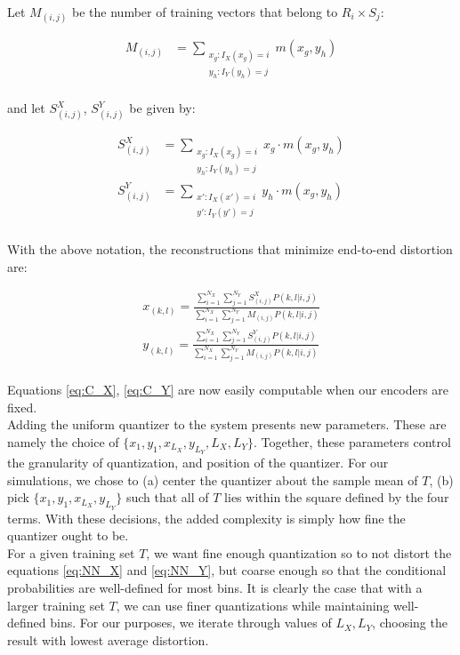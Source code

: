 \documentclass[10pt]{article}
\begin{document}
Let $M_{(i,j)}$ be the number of training vectors that belong to $R_i\times S_j$:

\begin{align}
    M_{(i,j)} &=
    \sum_{\substack{x_g:I_X(x_g)=i\\y_h:I_Y(y_h)=j}}m(x_g,y_h)
\end{align}
\\
and let $S_{(i,j)}^X$, $S_{(i,j)}^Y$ be given by:

\begin{align}
    S^X_{(i,j)} &=
    \sum_{\substack{x_g:I_X(x_g)=i\\y_h:I_Y(y_h)=j}}x_g\cdot m(x_g,y_h)\\
    S^Y_{(i,j)} &=
    \sum_{\substack{x':I_X(x')=i\\y':I_Y(y')=j}}y_h\cdot m(x_g,y_h)
\end{align}
\\
With the above notation, the reconstructions that minimize end-to-end distortion are:

\begin{align}
    \label{eq:C_X}
    x_{(k,l)} = 
        \frac{\sum_{i=1}^{N_X} \sum_{j=1}^{N_Y}
        S_{(i,j)}^X P(k,l|i,j)}
        {\sum_{i=1}^{N_X} \sum_{j=1}^{N_Y}
        M_{(i,j)} P(k,l|i,j)}\\
    \label{eq:C_Y}
    y_{(k,l)} = 
        \frac{\sum_{i=1}^{N_X} \sum_{j=1}^{N_Y}
        S_{(i,j)}^Y P(k,l|i,j)}
        {\sum_{i=1}^{N_X} \sum_{j=1}^{N_Y}
        M_{(i,j)} P(k,l|i,j)}
\end{align}
\\
Equations \eqref{eq:C_X}, \eqref{eq:C_Y} are now easily computable when our encoders are fixed.\\

Adding the uniform quantizer to the system presents new parameters. These are namely the choice of $\{x_1, y_1, x_{L_X}, y_{L_Y}, L_X, L_Y\}$. Together, these parameters control the granularity of quantization, and position of the quantizer. For our simulations, we chose to (a) center the quantizer about the sample mean of $T$, (b) pick $\{x_1, y_1, x_{L_X}, y_{L_Y}\}$ such that all of $T$ lies within the square defined by the four terms. With these decisions, the added complexity is simply how fine the quantizer ought to be.\\

For a given training set $T$, we want fine enough quantization so to not distort the equations \eqref{eq:NN_X} and \eqref{eq:NN_Y}, but coarse enough so that the conditional probabilities are well-defined for most bins. It is clearly the case that with a larger training set $T$, we can use finer quantizations while maintaining well-defined bins. For our purposes, we iterate through values of $L_X, L_Y$, choosing the result with lowest average distortion.\\
\end{document}
